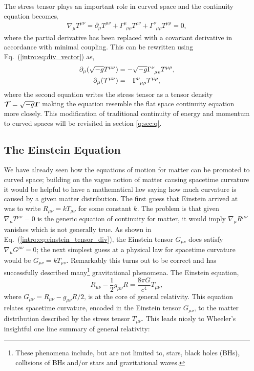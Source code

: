 The stress tensor plays an important role in curved space and the continuity equation becomes,
\begin{align}
\nabla_\mu T^{\mu\nu} = \partial_\mu T^{\mu\nu}  + \Gamma^\mu_{\,\,\,\mu \rho}T^{\rho \nu}  + \Gamma^\nu_{\,\,\,\mu\rho}T^{\mu\rho}= 0\label{intro:eq:cont},
\end{align}
where the partial derivative has been replaced with a covariant derivative in accordance with minimal coupling. This can be rewritten using Eq.~(\ref{intro:eq:div_vector}) as, 
\begin{align}
\partial_\mu( \sqrt{-g} T^{\mu\nu})  &=-\sqrt{-g} \Gamma^\nu_{\,\,\,\mu\rho}T^{\mu\rho},\\
\partial_\mu( \mathcal{T}^{\mu\nu})  &=-\Gamma^\nu_{\,\,\,\mu\rho}\mathcal{T}^{\mu\rho},
\end{align}
where the second equation writes the stress tensor as a tensor density $\boldsymbol{\mathcal{T}} = \sqrt{-g} \boldsymbol{T}$ making the equation resemble the flat space continuity equation more closely. This modification of traditional continuity of energy and momentum to curved spaces will be revisited in section \ref{q:sec:q}.


\subsection{The Einstein Equation}
We have already seen how the equations of motion for matter can be promoted to curved space; building on the vague notion of matter causing spacetime curvature it would be helpful to have a mathematical law saying how much curvature is caused by a given matter distribution. The first guess that Einstein arrived at was to write $R_{\mu\nu}=kT_{\mu\nu}$ for some constant $k$. The problem is that given $\nabla_\mu T^{\mu\nu}=0$ is the generic equation of continuity for matter, it would imply $\nabla_\mu R^{\mu\nu}$ vanishes which is not generally true. As shown in Eq.~(\ref{intro:eq:einstein_tensor_div}), the Einstein tensor $G_{\mu\nu}$ does satisfy $\nabla_\mu G^{\mu\nu}=0$; the next simplest guess at a physical law for spacetime curvature would be $G_{\mu\nu} = k T_{\mu\nu}$. Remarkably this turns out to be correct and has successfully described many\footnote{These phenomena include, but are not limited to, stars, black holes (BHs), collisions of BHs and/or stars and gravitational waves.} gravitational phenomena. The Einstein equation,
\begin{equation}\label{intro:eq:einstein}
R_{\mu\nu} - \frac{1}{2}g_{\mu\nu}R = \frac{8 \pi G}{c^4}T_{\mu\nu},
\end{equation}
where $G_{\mu\nu} = R_{\mu\nu}- g_{\mu\nu}R/2$, is at the core of general relativity. This equation relates spacetime curvature, encoded in the Einstein tensor $G_{\mu\nu}$, to the matter distribution described by the stress tensor $T_{\mu\nu}$. This leads nicely to Wheeler's insightful one line summary of general relativity: 

